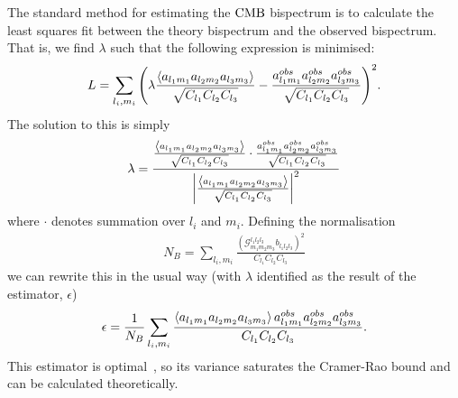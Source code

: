     The standard method for estimating the $\text{CMB}$ bispectrum is to calculate the least squares
    fit between the theory bispectrum and the observed bispectrum. That is, we find $\lambda$
    such that the following expression is minimised:
    \begin{align}
        L=\sum_{l_i,m_i}{\left(\lambda\frac{\left<a_{l_1m_1}a_{l_2m_2}a_{l_3m_3}\right>}{\sqrt{C_{l_1}C_{l_2}C_{l_3}}}
                - \frac{a^{obs}_{l_1m_1}a^{obs}_{l_2m_2}a^{obs}_{l_3m_3}}{\sqrt{C_{l_1}C_{l_2}C_{l_3}}}\right)}^2.
    \end{align}
    The solution to this is simply
    \begin{align}
        \lambda = \frac{\frac{\left<a_{l_1m_1}a_{l_2m_2}a_{l_3m_3}\right>}{\sqrt{C_{l_1}C_{l_2}C_{l_3}}}\cdot\frac{a^{obs}_{l_1m_1}a^{obs}_{l_2m_2}a^{obs}_{l_3m_3}}{\sqrt{C_{l_1}C_{l_2}C_{l_3}}}}{\left|\frac{\left<a_{l_1m_1}a_{l_2m_2}a_{l_3m_3}\right>}{\sqrt{C_{l_1}C_{l_2}C_{l_3}}}\right|^2}
    \end{align}
    where $\cdot$ denotes summation over $l_i$ and $m_i$.
    Defining the normalisation~\cite{Fergusson_polyspectra, Fergusson_efficient} 
    \begin{align}
        N_B = \sum_{l_i,m_i}\frac{\left(\mathcal{G}^{l_1l_2l_3}_{m_1m_2m_3}b_{l_1l_2l_3}\right)^2}{C_{l_1}C_{l_2}C_{l_3}}
    \end{align}
    we can rewrite this in the usual way (with $\lambda$ identified as the result of the estimator, $\epsilon$)
    \begin{align}
        \epsilon = \frac{1}{N_B}\sum_{l_i,m_i}\frac{\left<a_{l_1m_1}a_{l_2m_2}a_{l_3m_3}\right>a^{obs}_{l_1m_1}a^{obs}_{l_2m_2}a^{obs}_{l_3m_3}}{C_{l_1}C_{l_2}C_{l_3}}.
    \end{align}
    This estimator is optimal~\cite{Babich:2005en}, so its variance
    saturates the Cramer-Rao bound and can be calculated theoretically.


